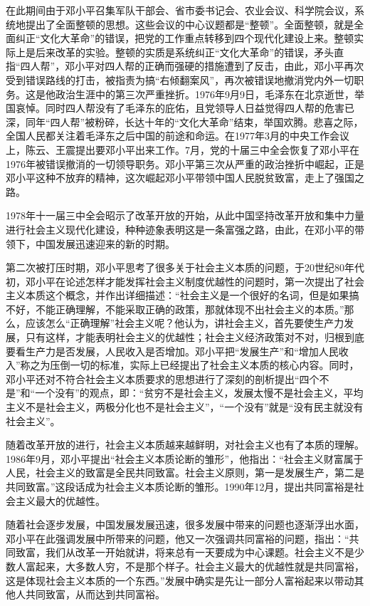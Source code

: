 \documentclass[cs4size,a4paper,nofonts,twoside]{ctexart}
\begin{document}
在此期间由于邓小平召集军队干部会、省市委书记会、农业会议、科学院会议，系统地提出了全面整顿的思想。这些会议的中心议题都是“整顿”。全面整顿，就是全面纠正“文化大革命”的错误，把党的工作重点转移到四个现代化建设上来。整顿实际上是后来改革的实验。整顿的实质是系统纠正“文化大革命”的错误，矛头直指“四人帮”，邓小平对四人帮的正确而强硬的措施遭到了反击，由此，邓小平再次受到错误路线的打击，被指责为搞“右倾翻案风”，再次被错误地撤消党内外一切职务。这是他政治生涯中的第三次严重挫折。1976年9月9日，毛泽东在北京逝世，举国哀悼。同时四人帮没有了毛泽东的庇佑，且党领导人日益觉得四人帮的危害已深，同年“四人帮”被粉碎，长达十年的“文化大革命”结束，举国欢腾。悲喜之际，全国人民都关注着毛泽东之后中国的前途和命运。在1977年3月的中央工作会议上，陈云、王震提出要邓小平出来工作。7月，党的十届三中全会恢复了邓小平在1976年被错误撤消的一切领导职务。邓小平第三次从严重的政治挫折中崛起，正是邓小平这种不放弃的精神，这次崛起邓小平带领中国人民脱贫致富，走上了强国之路。

1978年十一届三中全会昭示了改革开放的开始，从此中国坚持改革开放和集中力量进行社会主义现代化建设，种种迹象表明这是一条富强之路，由此，在邓小平的带领下，中国发展迅速迎来的新的时期。	

第二次被打压时期，邓小平思考了很多关于社会主义本质的问题，于20世纪80年代初，邓小平在论述怎样才能发挥社会主义制度优越性的问题时，第一次提出了社会主义本质这个概念，并作出详细描述：“社会主义是一个很好的名词，但是如果搞不好，不能正确理解，不能采取正确的政策，那就体现不出社会主义的本质。”那么，应该怎么“正确理解”社会主义呢？他认为，讲社会主义，首先要使生产力发展，只有这样，才能表明社会主义的优越性；社会主义经济政策对不对，归根到底要看生产力是否发展，人民收入是否增加。邓小平把“发展生产”和“增加人民收入”称之为压倒一切的标准，实际上已经提出了社会主义本质的核心内容。同时，邓小平还对不符合社会主义本质要求的思想进行了深刻的剖析提出“四个不是”和“一个没有”的观点，即：“贫穷不是社会主义，发展太慢不是社会主义，平均主义不是社会主义，两极分化也不是社会主义”，“一个没有”就是“没有民主就没有社会主义”。

随着改革开放的进行，社会主义本质越来越鲜明，对社会主义也有了本质的理解。1986年9月，邓小平提出“社会主义本质论断的雏形”，他指出：“社会主义财富属于人民，社会主义的致富是全民共同致富。社会主义原则，第一是发展生产，第二是共同致富。”这段话成为社会主义本质论断的雏形。1990年12月，提出共同富裕是社会主义最大的优越性。

随着社会逐步发展，中国发展发展迅速，很多发展中带来的问题也逐渐浮出水面，邓小平在此强调发展中所带来的问题，他又一次强调共同富裕的问题，指出：“共同致富，我们从改革一开始就讲，将来总有一天要成为中心课题。社会主义不是少数人富起来，大多数人穷，不是那个样子。社会主义最大的优越性就是共同富裕，这是体现社会主义本质的一个东西。”发展中确实是先让一部分人富裕起来以带动其他人共同致富，从而达到共同富裕。
\end{document}

